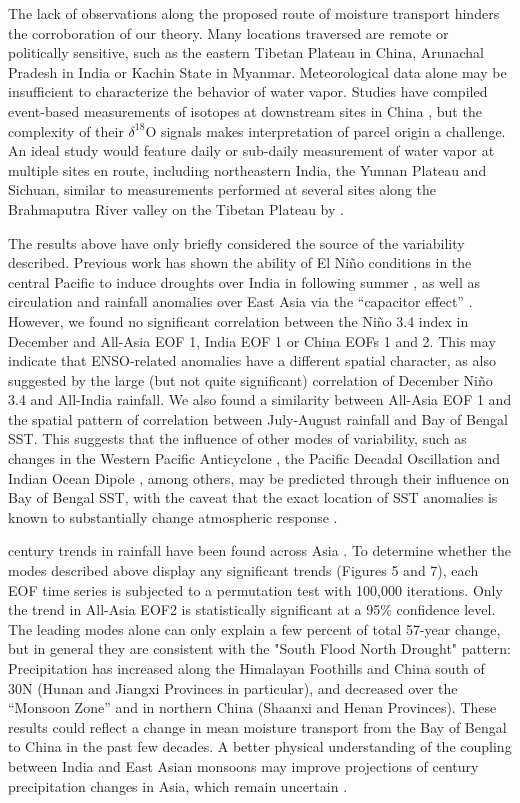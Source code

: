 \documentclass[12pt]{article}
\begin{document}
	The lack of observations along the proposed route of moisture transport hinders the corroboration of our theory. Many locations traversed are remote or politically sensitive, such as the eastern Tibetan Plateau in China, Arunachal Pradesh in India or Kachin State in Myanmar. Meteorological data alone may be insufficient to characterize the behavior of water vapor. Studies have compiled event-based measurements of isotopes at downstream sites in China \citep{Yang2011a,Wu2014}, but the complexity of their $\delta ^{18}$O signals makes interpretation of parcel origin a challenge. An ideal study would feature daily or sub-daily measurement of water vapor at multiple sites en route, including northeastern India, the Yunnan Plateau and Sichuan, similar to measurements performed at several sites along the Brahmaputra River valley on the Tibetan Plateau by \cite{Gao2011}. 

	The results above have only briefly considered the source of the variability described. Previous work has shown the ability of El Ni\~no conditions in the central Pacific to induce droughts over India in following summer \citep{Kumar2006}, as well as circulation and rainfall anomalies over East Asia via the ``capacitor effect'' \citep{Xie2009}. However, we found no significant correlation between the Ni\~no 3.4 index in December and All-Asia EOF 1, India EOF 1 or China EOFs 1 and 2. This may indicate that ENSO-related anomalies have a different spatial character, as also suggested by the large (but not quite significant) correlation of December Ni\~no 3.4 and All-India rainfall. We also found a similarity between All-Asia EOF 1 and the spatial pattern of correlation between July-August rainfall and Bay of Bengal SST. This suggests that the influence of other modes of variability, such as changes in the Western Pacific Anticyclone \citep{Kosaka2011}, the Pacific Decadal Oscillation \citep{Mantua2002} and Indian Ocean Dipole \citep{Saji1999}, among others, may be predicted through their influence on Bay of Bengal SST, with the caveat that the exact location of SST anomalies is known to substantially change atmospheric response \citep{Xie2009}.
	
	 century trends in rainfall have been found across Asia \citep{Christensen2011}. To determine whether the modes described above display any significant trends (Figures 5 and 7), each EOF time series is subjected to a permutation test with 100,000 iterations. Only the trend in All-Asia EOF2 is statistically significant at a 95\% confidence level. The leading modes alone can only explain a few percent of total 57-year change, but in general they are consistent with the "South Flood North Drought" pattern: Precipitation has increased along the Himalayan Foothills and China south of 30\textdegree N (Hunan and Jiangxi Provinces in particular), and decreased over the ``Monsoon Zone'' and in northern China (Shaanxi and Henan Provinces). These results could reflect a change in mean moisture transport from the Bay of Bengal to China in the past few decades. A better physical understanding of the coupling between India and East Asian monsoons may improve projections of  century precipitation changes in Asia, which remain uncertain \citep{Christensen2011}.
	
\end{document}
